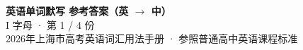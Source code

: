 \documentclass[10pt,a4paper]{article}
\begin{document}
\pagestyle{plain}

\begin{center}
{\LARGE\bfseries 英语单词默写 \quad 参考答案（英 $\to$ 中）}\\[0.22em]
{\large I 字母 · 第 1 / 4 份}\\[0.18em]
{\small 2026年上海市高考英语词汇用法手册 · 参照普通高中英语课程标准}
\end{center}

\vspace{0.2em}
\noindent{\color{rulegray}\rule{\textwidth}{0.8pt}}

\vspace{0.35em}

\vspace{0.25em}
\renewcommand{\arraystretch}{1.32}
\end{document}
